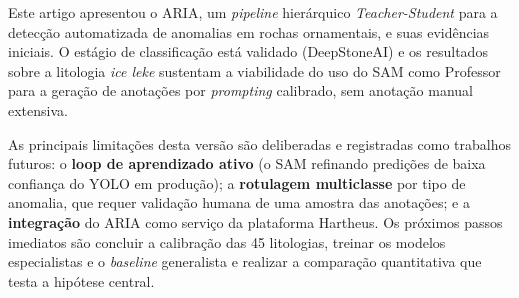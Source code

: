 \documentclass[12pt]{article}
\begin{document}
Este artigo apresentou o ARIA, um \textit{pipeline} hierárquico \textit{Teacher-Student} para a detecção automatizada de anomalias em rochas ornamentais, e suas evidências iniciais. O estágio de classificação está validado (DeepStoneAI) e os resultados sobre a litologia \textit{ice leke} sustentam a viabilidade do uso do SAM como Professor para a geração de anotações por \textit{prompting} calibrado, sem anotação manual extensiva.

As principais limitações desta versão são deliberadas e registradas como trabalhos futuros: o \textbf{loop de aprendizado ativo} (o SAM refinando predições de baixa confiança do YOLO em produção); a \textbf{rotulagem multiclasse} por tipo de anomalia, que requer validação humana de uma amostra das anotações; e a \textbf{integração} do ARIA como serviço da plataforma Hartheus. Os próximos passos imediatos são concluir a calibração das 45 litologias, treinar os modelos especialistas e o \textit{baseline} generalista e realizar a comparação quantitativa que testa a hipótese central.



\end{document}

